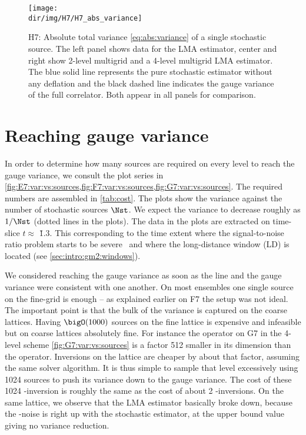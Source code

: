 \begin{figure}
\centering
\texttt{[image: \\dir/img/H7/H7\_abs\_variance]}
\caption{
H7: Absolute total variance \cref{eq:abs:variance} of a single stochastic source.
The left panel shows data for the LMA estimator, center and right show 2-level multigrid and a 4-level multigrid LMA estimator.
The blue solid line represents the pure stochastic estimator without any deflation and the black dashed line indicates the gauge variance of the full correlator. Both appear in all panels for comparison.
}
\label{fig:H7:abs:variance}
\end{figure}

\section{Reaching gauge variance}
\label{sec:numerics:reaching:gauge:variance}

In order to determine how many sources are required on every level to reach the gauge variance, we consult the plot series in \cref{fig:E7:var:vs:sources,fig:F7:var:vs:sources,fig:G7:var:vs:sources}.
The required numbers are assembled in \cref{tab:cost}.
The plots show the variance against the number of stochastic sources $\Nst$.
We expect the variance to decrease roughly as $1/\Nst$ (dotted lines in the plots).
The data in the plots are extracted on time-slice $t \approx $ \u{1.3}{\femto \metre}.
This corresponding to the time extent where the signal-to-noise ratio problem starts to be severe~\cite{Kuberski_2023} and where the long-distance window (LD) is located (see \cref{sec:intro:gm2:windows}).

We considered reaching the gauge variance as soon as the line and the gauge variance were consistent with one another.
On most ensembles one single source on the fine-grid is enough -- as explained earlier on F7 the setup was not ideal.
The important point is that the bulk of the variance is captured on the coarse lattices.
Having $\bigO(1000)$ sources on the fine lattice is expensive and infeasible but on coarse lattices absolutely fine.
For instance the  operator on G7 in the 4-level scheme \cref{fig:G7:var:vs:sources} is a factor \num{512} smaller in its dimension than the  operator.
Inversions on the  lattice are cheaper by about that factor, assuming the same solver algorithm.
It is thus simple to sample that level excessively using \num{1024} sources to push its variance down to the gauge variance.
The cost of these \num{1024} -inversion is roughly the same as the cost of about \num{2} -inversions.
On the same lattice, we observe that the LMA estimator basically broke down, because the -noise is right up with the stochastic estimator, \ie at the upper bound value giving no variance reduction.

